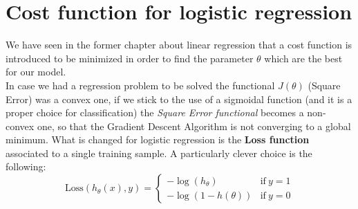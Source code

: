 \section{Cost function for logistic regression}
We have seen in the former chapter about linear regression that a cost function is introduced to be minimized in order to find the parameter $\theta$ which are the best for our model.\\
In case we had a regression problem to be solved the functional $J(\theta)$ (Square Error) was a convex one, if we stick to the use of a sigmoidal function (and it is a proper choice for classification) the \textit{Square Error functional} becomes a non-convex one, so that the Gradient Descent Algorithm is not converging to a global minimum. What is changed for logistic regression is the \textbf{Loss function} associated to a single training sample. A particularly clever choice is the following:
\begin{equation}
    \text{Loss}(h_\theta(x),y) = \begin{cases}
        -\log(h_\theta)&\text{if} \ y=1\\
        -\log(1-h(\theta))&\text{if}\ y=0
    \end{cases}
\end{equation}

